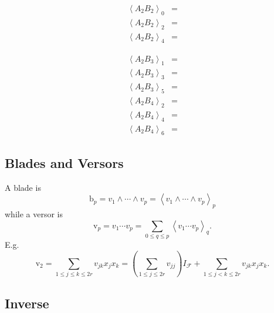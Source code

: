 \documentclass[aps,preprint]{revtex4}%
\begin{document}
\begin{align}
\left\langle A_{2}B_{2}\right\rangle _{0}  &  =\\
\left\langle A_{2}B_{2}\right\rangle _{2}  &  =\\
\left\langle A_{2}B_{2}\right\rangle _{4}  &  =
\end{align}
%

\begin{align}
\left\langle A_{2}B_{3}\right\rangle _{1}  &  =\\
\left\langle A_{2}B_{3}\right\rangle _{3}  &  =\\
\left\langle A_{2}B_{3}\right\rangle _{5}  &  =
\end{align}%
\begin{align}
\left\langle A_{2}B_{4}\right\rangle _{2}  &  =\\
\left\langle A_{2}B_{4}\right\rangle _{4}  &  =\\
\left\langle A_{2}B_{4}\right\rangle _{6}  &  =
\end{align}


\subsection{Blades and Versors}

A blade is
\begin{equation}
\mathrm{b}_{p}=v_{1}\wedge\cdots\wedge v_{p}=\left\langle v_{1}\wedge
\cdots\wedge v_{p}\right\rangle _{p}%
\end{equation}
while a versor is
\begin{equation}
\mathrm{v}_{p}=v_{1}\cdots v_{p}=\sum_{0\leq q\leq p}\left\langle v_{1}\cdots
v_{p}\right\rangle _{q}.
\end{equation}
E.g.%
\begin{equation}
\mathrm{v}_{2}=\sum_{1\leq j\leq k\leq2r}v_{jk}x_{j}x_{k}=\left(  \sum_{1\leq
j\leq2r}v_{jj}\right)  I_{\mathcal{F}}+\sum_{1\leq j<k\leq2r}v_{jk}x_{j}x_{k}.
\end{equation}


\subsection{Inverse}
\end{document}
